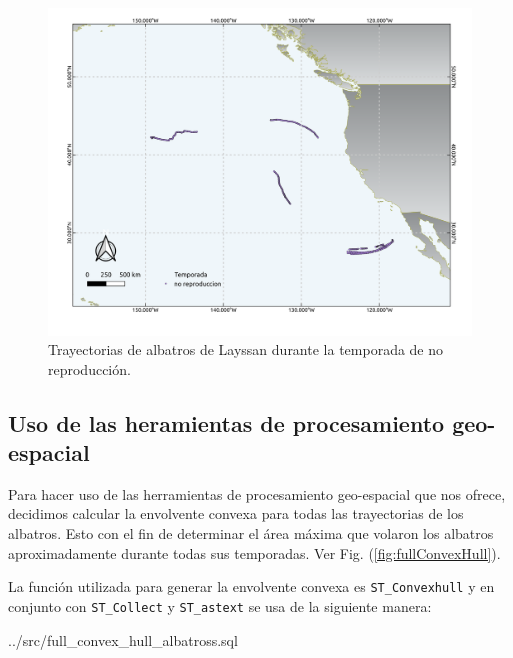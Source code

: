 \begin{figure}[h]
    \centering
    \includegraphics[scale=0.60]{figures/seasonsNoReproduccion.png}
    \caption{Trayectorias de albatros de Layssan durante la temporada de no
    reproducción.}
    \label{fig:NoReproduccion}
\end{figure}

\subsection{Uso de las heramientas de procesamiento geo-espacial}

Para hacer uso de las herramientas de procesamiento geo-espacial que nos ofrece,
decidimos calcular la envolvente convexa para todas las trayectorias de los
albatros. Esto con el fin de determinar el área máxima que volaron los albatros
aproximadamente durante todas sus temporadas. Ver Fig. (\ref{fig:fullConvexHull}).

La función utilizada para generar la envolvente convexa es
\texttt{ST\_Convexhull} y en conjunto con \texttt{ST\_Collect} y
\texttt{ST\_astext} se usa de la siguiente manera:

 {../src/full_convex_hull_albatross.sql}

